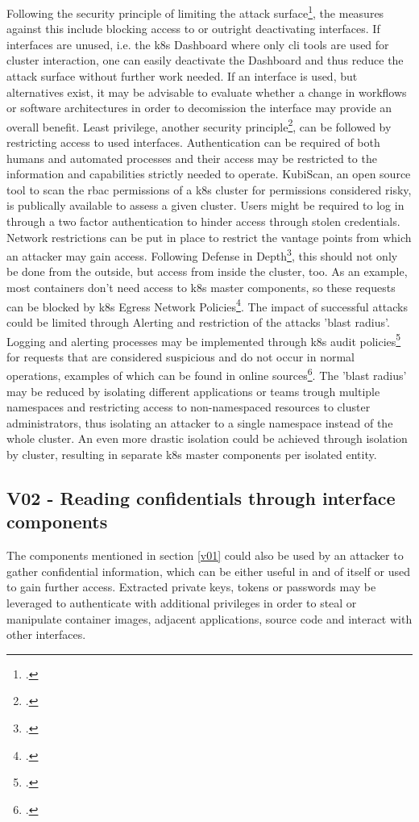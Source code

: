 Following the security principle of limiting the attack surface\footcite[][, p. 4 to 5]{k8sBook}, the measures against this include blocking access to or outright deactivating interfaces. If interfaces are unused, i.e. the \gls{k8s} Dashboard where only \gls{cli} tools are used for cluster interaction, one can easily deactivate the Dashboard and thus reduce the attack surface without further work needed. If an interface is used, but alternatives exist, it may be advisable to evaluate whether a change in workflows or software architectures in order to decomission the interface may provide an overall benefit.
Least privilege, another security principle\footcite[][, p. 3 to 4]{k8sBook}, can be followed by restricting access to used interfaces. Authentication can be required of both humans and automated processes and their access may be restricted to the information and capabilities strictly needed to operate. KubiScan, an open source tool to scan the \gls{rbac} permissions of a \gls{k8s} cluster for permissions considered risky, is publically available to assess a given cluster. Users might be required to log in through a two factor authentication to hinder access through stolen credentials. Network restrictions can be put in place to restrict the vantage points from which an attacker may gain access.
Following Defense in Depth\footcite[][, p. 3]{k8sBook}, this should not only be done from the outside, but access from inside the cluster, too. As an example, most containers don't need access to \gls{k8s} master components, so these requests can be blocked by \gls{k8s} Egress Network Policies\footcite[][, section 'The NetworkPolicy Resource']{egressNetPol}. The impact of successful attacks could be limited through Alerting and restriction of the attacks 'blast radius'. Logging and alerting processes may be implemented through \gls{k8s} audit policies\footcite[][, section 'Audit Policy']{auditPolicy} for requests that are considered suspicious and do not occur in normal operations, examples of which can be found in online sources\footcite[][, section 'Alerting on the Kubernetes infrastructure']{sysdigMonitoring}. The 'blast radius' may be reduced by isolating different applications or teams trough multiple namespaces and restricting access to non-namespaced resources to cluster administrators, thus isolating an attacker to a single namespace instead of the whole cluster. An even more drastic isolation could be achieved through isolation by cluster, resulting in separate \gls{k8s} master components per isolated entity.

\subsection{V02 - Reading confidentials through interface components}
The components mentioned in section \ref{v01} could also be used by an attacker to gather confidential information, which can be either useful in and of itself or used to gain further access. Extracted private keys, tokens or passwords  may be leveraged to authenticate with additional privileges in order to steal or manipulate container images, adjacent applications, source code and interact with other interfaces.

